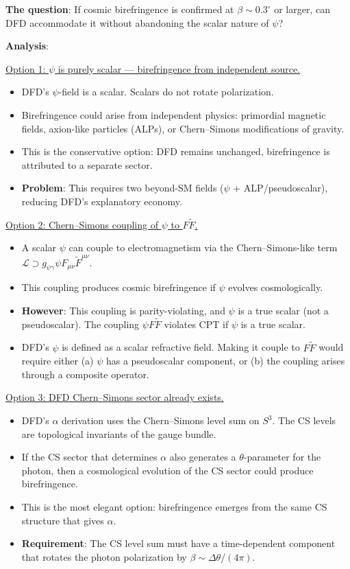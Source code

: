 \documentclass[11pt,a4paper]{article}
\begin{document}
\begin{tcolorbox}[colback=red!5!white, colframe=red!60!black,
  title={CRITICAL: Can DFD Accommodate $\beta \neq 0$?}]

\textbf{The question}: If cosmic birefringence is confirmed at $\beta \sim 0.3^\circ$ or larger, can DFD accommodate it without abandoning the scalar nature of $\psi$?

\textbf{Analysis}:

\underline{Option 1: $\psi$ is purely scalar --- birefringence from independent source.}
\begin{itemize}
\item DFD's $\psi$-field is a scalar. Scalars do not rotate polarization.
\item Birefringence could arise from independent physics: primordial magnetic fields, axion-like particles (ALPs), or Chern--Simons modifications of gravity.
\item This is the conservative option: DFD remains unchanged, birefringence is attributed to a separate sector.
\item \textbf{Problem}: This requires two beyond-SM fields ($\psi$ + ALP/pseudoscalar), reducing DFD's explanatory economy.
\end{itemize}

\underline{Option 2: Chern--Simons coupling of $\psi$ to $F \tilde{F}$.}
\begin{itemize}
\item A scalar $\psi$ can couple to electromagnetism via the Chern--Simons-like term $\mathcal{L} \supset g_{\psi\gamma} \psi F_{\mu\nu} \tilde{F}^{\mu\nu}$.
\item This coupling produces cosmic birefringence if $\psi$ evolves cosmologically.
\item \textbf{However}: This coupling is parity-violating, and $\psi$ is a true scalar (not a pseudoscalar). The coupling $\psi F \tilde{F}$ violates CPT if $\psi$ is a true scalar.
\item DFD's $\psi$ is defined as a scalar refractive field. Making it couple to $F \tilde{F}$ would require either (a) $\psi$ has a pseudoscalar component, or (b) the coupling arises through a composite operator.
\end{itemize}

\underline{Option 3: DFD Chern--Simons sector already exists.}
\begin{itemize}
\item DFD's $\alpha$ derivation uses the Chern--Simons level sum on $S^3$. The CS levels are topological invariants of the gauge bundle.
\item If the CS sector that determines $\alpha$ also generates a $\theta$-parameter for the photon, then a cosmological evolution of the CS sector could produce birefringence.
\item This is the most elegant option: birefringence emerges from the same CS structure that gives $\alpha$.
\item \textbf{Requirement}: The CS level sum must have a time-dependent component that rotates the photon polarization by $\beta \sim \Delta\theta/(4\pi)$.
\end{itemize}


\end{tcolorbox}
\end{document}

